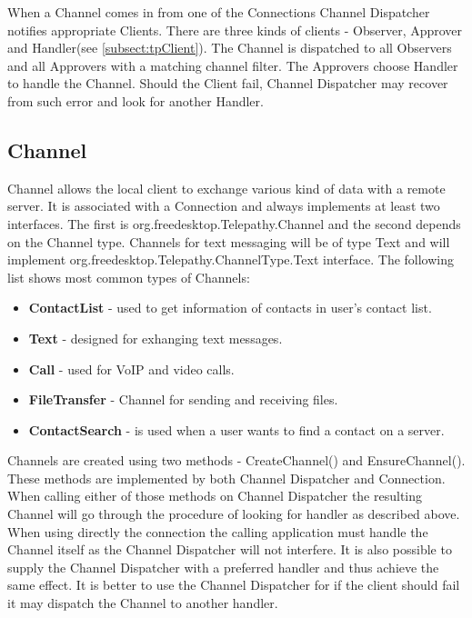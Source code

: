 When a Channel comes in from one of the Connections Channel Dispatcher notifies appropriate Clients. There are three kinds of clients - Observer, Approver and Handler(see \ref{subsect:tpClient}). The Channel is dispatched to all Observers and all Approvers with a matching channel filter. The Approvers choose Handler to handle the Channel. Should the Client fail, Channel Dispatcher may recover from such error and look for another Handler.\cite{tpWikiBasicTerminology}\cite{tpWikiChannelDispatcher}  


\subsection*{Channel}
Channel allows the local client to exchange various kind of data with a remote server. It is associated with a Connection and always implements at least two interfaces. The first is org.freedesktop.Telepathy.Channel and the second depends on the Channel type. Channels for text messaging will be of type Text and will implement org.freedesktop.Telepathy.ChannelType.Text interface. The following list shows most common types of Channels\cite{tpWikiChannel}:

\begin{itemize}

	\item {\bf ContactList} - used to get information of contacts in user's contact list.

	\item {\bf Text} - designed for exhanging text messages. 

	\item {\bf Call} - used for VoIP and video calls. 

	\item {\bf FileTransfer} - Channel for sending and receiving files.

	\item {\bf ContactSearch} - is used when a user wants to find a contact on a server.

\end{itemize}

Channels are created using two methods - CreateChannel() and EnsureChannel(). These methods are implemented by both Channel Dispatcher and Connection. When calling either of those methods on Channel Dispatcher the resulting Channel will go through the procedure of looking for handler as described above. When using directly the connection the calling application must handle the Channel itself as the Channel Dispatcher will not interfere. It is also possible to supply the Channel Dispatcher with a preferred handler and thus achieve the same effect. It is better to use the Channel Dispatcher for if the client should fail it may dispatch the Channel to another handler.\cite{tpWikiRequestingChannels}\cite{incomingChannels}

